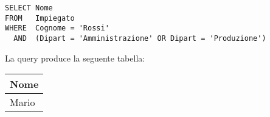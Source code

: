 \begin{lstlisting}
SELECT Nome
FROM   Impiegato
WHERE  Cognome = 'Rossi'
  AND  (Dipart = 'Amministrazione' OR Dipart = 'Produzione')
\end{lstlisting}

La query produce la seguente tabella:

\begin{center}
	\begin{tabular}{@{} l @{}}
		\toprule
			Nome \\
		\midrule
			Mario \\
		\bottomrule
	\end{tabular}
\end{center}
